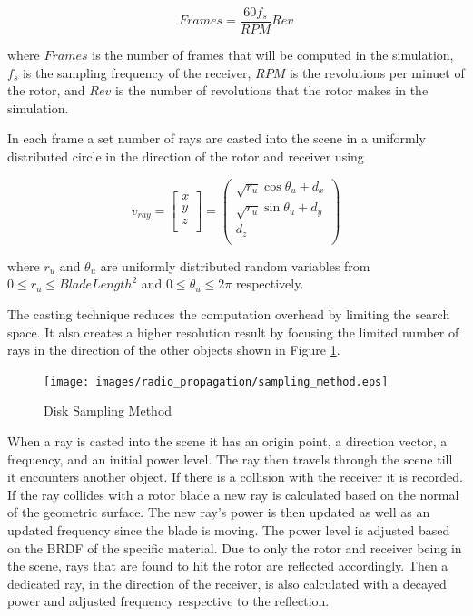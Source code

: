 \begin{equation}
	Frames = \frac{60  f_s}{RPM} Rev
	\label{eqn:frames}
\end{equation}

where $Frames$ is the number of frames that will be computed in the simulation, $f_s$ is the sampling frequency of the receiver, $RPM$ is the revolutions per minuet of the rotor, and $Rev$ is the number of revolutions that the rotor makes in the simulation.

In each frame a set number of rays are casted into the scene in a uniformly distributed circle in the direction of the rotor and receiver using

\begin{equation}
	v_{ray} = \begin{bmatrix}
			x \\
			y \\
			z \\
	\end{bmatrix}
	= \begin{pmatrix}
			\sqrt{r_u} \cos{\theta_u}  + d_x\\
			\sqrt{r_u} \sin{\theta_u}  + d_y \\
			d_z \\
	\end{pmatrix}
	\label{eqn:disk}
\end{equation}

where $r_u$ and $\theta_u$ are uniformly distributed random variables from $0 \leq r_u \leq BladeLength^{2}$ and $ 0 \leq \theta_u \leq 2\pi$ respectively.

The casting technique reduces the computation overhead by limiting the search space. It also creates a higher resolution result by focusing the limited number of rays in the direction of the other objects shown in Figure \ref{fig:samp_method}.

\begin{figure}
	\begin{center}
		\texttt{[image: images/radio\_propagation/sampling\_method.eps]}
		\caption{Disk Sampling Method}
		\label{fig:samp_method}
	\end{center}
\end{figure}

When a ray is casted into the scene it has an origin point, a direction vector, a frequency, and an initial power level. The ray then travels through the scene till it encounters another object. If there is a collision with the receiver it is recorded. If the ray collides with a rotor blade a new ray is calculated based on the normal of the geometric surface. The new ray's power is then updated as well as an updated frequency since the blade is moving. The power level is adjusted based on the BRDF of the specific material. Due to only the rotor and receiver being in the scene, rays that are found to hit the rotor are reflected accordingly. Then a dedicated ray, in the direction of the receiver, is also calculated with a decayed power and adjusted frequency respective to the reflection.


